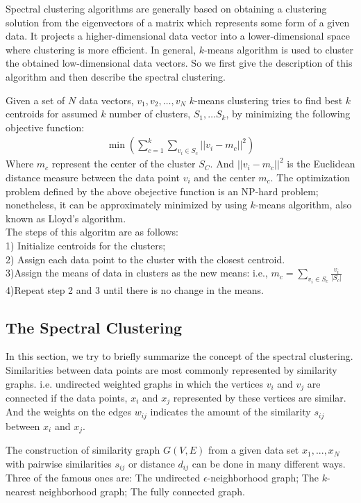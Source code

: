 \documentclass[twocolumn,notitlepage]{revtex4-1}
\begin{document}
Spectral clustering algorithms are generally based on obtaining a clustering solution from the eigenvectors of a matrix which represents some form of a given data. It projects a higher-dimensional data vector into a lower-dimensional space where clustering is more efficient. In general, $k$-means algorithm is used to cluster the obtained low-dimensional data vectors. So we first give the description of this algorithm and then describe the spectral clustering.

Given a set of $N$ data vectors, $v_{1},v_{2},\dots,v_{N}$ $k$-means clustering tries to find best $k$ centroids for assumed $k$ number of clusters, $S_{1},…S_{k}$, by minimizing the following objective function:
\begin{align}
    \min(\sum_{c=1}^{k}\sum_{v_{i}\in S_{c}}||v_i-m_c||^2)
\end{align}
Where $m_{c}$ represent the center of the cluster $S_C$. And $||v_i-m_c||^2$ is the Euclidean distance measure between the data point $v_i$ and the center $m_c$. The optimization problem defined by the above obejective function is an NP-hard problem; nonetheless, it can be approximately minimized by using $k$-means algorithm, also known as Lloyd’s algorithm.\\ The steps of this algoritm are as follows:\\
1) Initialize centroids for the clusters;\\
2) Assign each data point to the cluster with the closest centroid.\\
3)Assign the means of data in clusters as the new means: i.e., $m_c=\sum_{v_{i}\in S_c}\frac{v_i}{|S_c|}$\\
4)Repeat step 2 and 3 until there is no change in the means.\\

\subsection{The Spectral Clustering}

In this section, we try to briefly summarize the concept of the spectral clustering. Similarities between data points are most commonly represented by similarity graphs. i.e. undirected weighted graphs in which the vertices $v_i$ and $v_j$ are connected if the data points, $x_i$ and $x_j$ represented by these vertices are similar. And the weights on the edges $w_{ij}$ indicates the amount of the similarity $s_{ij}$ between $x_i$ and $x_j$.

The construction of similarity graph $G(V,E)$ from a given data set ${x_{1},...,x_{N}}$ with pairwise similarities $s_{ij}$ or distance $d_{ij}$ can be done in many different ways. Three of the famous ones are: The undirected $\epsilon$-neighborhood graph; The $k$-nearest neighborhood graph; The fully connected graph.
\end{document}
